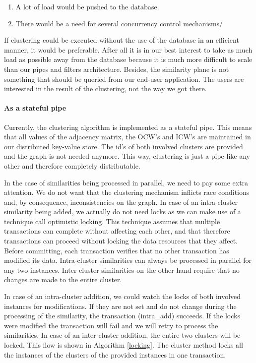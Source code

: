 \begin{enumerate}
\item A lot of load would be pushed to the database.
\item There would be a need for several concurrency control mechanisms/
\end{enumerate}

If clustering could be executed without the use of the database in an efficient manner, it would be preferable. After all it is in our best interest to take as much load as possible away from the database because it is much more difficult to scale than our pipes and filters architecture. Besides, the similarity plane is not something that should be queried from our end-user application. The users are interested in the result of the clustering, not the way we got there.

\paragraph{As a stateful pipe}

Currently, the clustering algorithm is implemented as a stateful pipe. This means that all values of the adjacency matrix, the OCW's and ICW's  are maintained in our distributed key-value store. The id's of both involved clusters are provided and the graph is not needed anymore. This way, clustering is just a pipe like any other and therefore completely distributable.

In the case of similarities being processed in parallel, we need to pay some extra attention. We do not want that the clustering mechanism inflicts race conditions and, by consequence, inconsistencies on the graph. In case of an intra-cluster similarity being added, we actually do not need locks as we can make use of a technique call optimistic locking. This technique assumes that multiple transactions can complete without affecting each other, and that therefore transactions can proceed without locking the data resources that they affect. Before committing, each transaction verifies that no other transaction has modified its data. Intra-cluster similarities can always be processed in parallel for any two instances. Inter-cluster similarities on the other hand require that no changes are made to the entire cluster.

In case of an intra-cluster addition, we could watch the locks of both involved instances for modifications. If they are not set and do not change during the processing of the similarity, the transaction (intra\_add) succeeds. If the locks were modified the transaction will fail and we will retry to process the similarities. In case of an inter-cluster addition, the entire two clusters will be locked. This flow is shown in Algorithm \autoref{locking}. The cluster method locks all the instances of the clusters  of the provided instances in one transaction.

